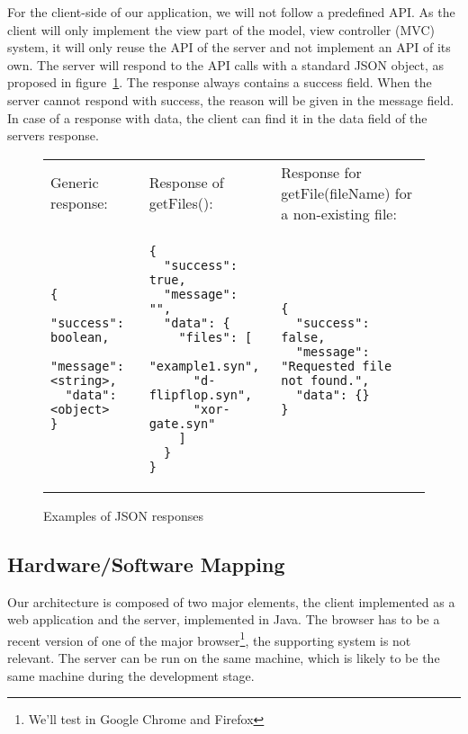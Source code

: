 \documentclass[a4paper]{article}
\begin{document}
For the client-side of our application, we will not follow a predefined API. As the client will only implement the view part of the model, view controller (MVC) system, it will only reuse the API of the server and not implement an API of its own. The server will respond to the API calls with a standard JSON object, as proposed in figure~\ref{fig-jsonDefault}. The response always contains a success field. When the server cannot respond with success, the reason will be given in the message field. In case of a response with data, the client can find it in the data field of the servers response. \\

\begin{figure}[h!]
\caption{Examples of JSON responses}
\label{fig-jsonDefault}
{\footnotesize
\begin{tabular}{p{4.3cm} p{4.3cm} p{4.3cm}}
\\
	Generic response: &
	Response of getFiles(): &
	Response for getFile(fileName) for a non-existing file: \\
\begin{verbatim}
{
  "success": boolean,
  "message": <string>,
  "data": <object>
}
\end{verbatim}

&

\begin{verbatim}
{
  "success": true,
  "message": "",
  "data": {
    "files": [
      "example1.syn",
      "d-flipflop.syn",
      "xor-gate.syn"
    ]
  }
}
\end{verbatim}

&

\begin{verbatim}
{
  "success": false,
  "message": "Requested file not found.",
  "data": {}
}
\end{verbatim}
\\
\end{tabular} }

\end{figure}

\pagebreak
\pagebreak

\subsection{Hardware/Software Mapping}
Our architecture is composed of two major elements, the client implemented as a web application and the server, implemented in Java. The browser has to be a recent version of one of the major browser\footnote{We'll test in Google Chrome and Firefox}, the supporting system is not relevant. The server can be run on the same machine, which is likely to be the same machine during the development stage.
\end{document}

